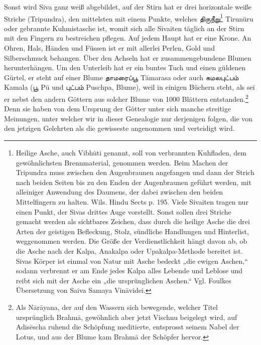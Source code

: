 \documentclass{article}
\newcommand{\TamilText}[1]{\texttamil{#1}}
\newcommand{\tam}[1]{\TamilText{#1}}
\begin{document}
Sonst wird Siva ganz weiß abgebildet, auf der Stirn hat er drei horizontale weiße Striche (Tripundra), den mittelsten mit einem Punkte, welches \tam{திருநீறு}\footnote{Heilige Asche, auch Vibh\={u}ti genannt, soll von verbrannten Kuhfladen, dem gewöhnlichsten Brennmaterial, genommen werden. Beim Machen der Tripundra muss zwischen den Augenbraunen angefangen und dann der Strich nach beiden Seiten bis zu den Enden der Augenbraunen geführt werden, mit alleiniger Anwendung des Daumens, der dabei zwischen den beiden Mittelfingern zu halten. Wils. Hindu Sects p. 195. Viele Sivaiten tragen nur einen Punkt, der Sivas drittes Auge vorstellt. Sonst sollen drei Striche gemacht werden als sichtbares Zeichen, dass durch die heilige Asche die drei Arten der geistigen Befleckung, Stolz, sündliche Handlungen und Hinterlist, weggenommen werden. Die Größe der Verdienstlichkeit hängt davon ab, ob die Asche nach der Kalpa, Anakalpa oder Upakalpa-Methode bereitet ist. Sivas Körper ist einmal von Natur mit Asche bedeckt „die ewigen Aschen,“ sodann verbrennt er am Ende jedes Kalpa alles Lebende und Leblose und reibt sich mit der Asche ein „die ursprünglichen Aschen.“ Vgl. Foulkes Übersetzung von Saiva Samaya Vin\={a}videi.} Tirunüru oder gebrannte Kuhmistasche ist, womit sich alle Sivaiten täglich an der Stirn mit den Fingern zu bestreichen pflegen. Auf jedem Haupt hat er eine Krone. An Ohren, Hals, Händen und Füssen ist er mit allerlei Perlen, Gold und Silberschmuck behangen. Über den Achseln hat er zusammengebundene Blumen herunterhängen. Um den Unterleib hat er ein buntes Tuch und einen güldenen Gürtel, er steht auf einer Blume \tam{தாமரைப்பூ} T\={a}marasa oder auch \tam{கமலபுட்பம்} Kamala (\tam{பூ} P\={u} und \tam{புட்பம்} Puschpa, Blume), weil in einigen Büchern steht, als sei er nebst den andern Göttern aus solcher Blume von 1000 Blättern entstanden.\footnote{Als N\={a}r\={a}yana, der auf den Wassern sich bewegende, welcher Titel ursprünglich Brahm\={a}, gewöhnlich aber jetzt Vischnu beigelegt wird, auf Adis\={e}scha ruhend die Schöpfung meditierte, entsprosst seinem Nabel der Lotus, und aus der Blume kam Brahm\={a} der Schöpfer hervor.} Denn sie haben von dem Ursprung der Götter unter sich manche streitige Meinungen, unter welcher wir in dieser Genealogie nur derjenigen folgen, die von den jetzigen Gelehrten als die gewisseste angenommen und verteidigt wird.
\end{document}

